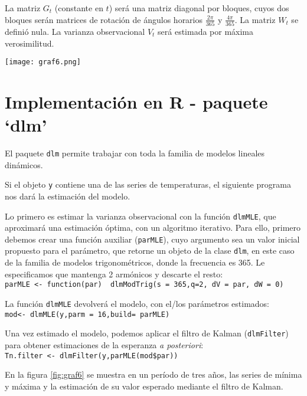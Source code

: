 \documentclass{article}
\begin{document}
La matriz $G_t$ (constante en $t$) será una matriz diagonal por bloques, cuyos dos bloques serán matrices de rotación de ángulos horarios $\frac{2\pi}{365}$ y $\frac{4\pi}{365}$. La matriz $W_t$ se definió nula. La varianza observacional $V_t$ será estimada por máxima verosimilitud.

\begin{center}
\texttt{[image: graf6.png]}
\vspace{-.75em}
\label{fig:graf6}
\end{center}


\section{Implementación en R - paquete `dlm'}

El paquete \verb|dlm| permite trabajar con toda la familia de modelos lineales dinámicos. %

Si el objeto \verb|y| contiene una de las series de temperaturas, el siguiente programa nos dará la estimación del modelo.

Lo primero es estimar la varianza observacional con la función \verb|dlmMLE|, que aproximará una estimación óptima, con un algoritmo iterativo. Para ello, primero debemos crear una función auxiliar (\verb|parMLE|), cuyo argumento sea un valor inicial propuesto para el parámetro, que retorne un objeto de la clase \verb|dlm|, en este caso de la familia de modelos trigonométricos, donde la frecuencia es 365. Le especificamos que mantenga 2 armónicos y descarte el resto:\\
\verb|parMLE <- function(par)  dlmModTrig(s = 365,q=2, dV = par, dW = 0)|

La función \verb|dlmMLE| devolverá el modelo, con el/los parámetros estimados:\\
\verb|mod<- dlmMLE(y,parm = 16,build= parMLE)|

Una vez estimado el modelo, podemos aplicar el filtro de Kalman (\verb|dlmFilter|) para obtener estimaciones de la esperanza \textit{a posteriori}:\\
\verb|Tn.filter <- dlmFilter(y,parMLE(mod$par))|

En la figura \ref{fig:graf6} se muestra en un período de tres años, las series de mínima y máxima y la estimación de su valor esperado mediante el filtro de Kalman.
\end{document}
